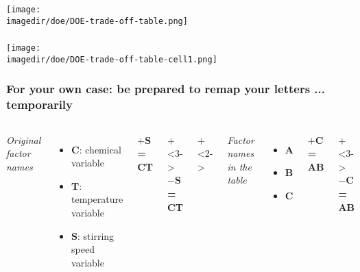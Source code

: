 \documentclass[handout,11pt,aspectratio=169,mathserif]{beamer}
\begin{document}
\begin{frame}\frametitle{}
	\begin{center}
	\texttt{[image: \\imagedir/doe/DOE-trade-off-table.png]}
	\end{center}
\end{frame}

\begin{frame}\frametitle{}
	\begin{center}
	\texttt{[image: \\imagedir/doe/DOE-trade-off-table-cell1.png]}
	\end{center}
\end{frame}

\begin{frame}\frametitle{For your own case: be prepared to remap your letters ... temporarily}
	\begin{columns}[b]
			\emph{Original factor names}
			
			\begin{itemize}
				\item	\textbf{C}: chemical variable
				\item	\textbf{T}: temperature variable
				\item	\textbf{S}: stirring speed variable
			\end{itemize}
			
			\vspace{1cm}
			\textbf{$+$S = CT}
			
		\onslide+<3->{
			\vspace{1cm}
			\textbf{$-$S = CT}
		}
			
		\onslide+<2->{
			\emph{Factor names in the table}
			
			\begin{itemize}
				\item	\textbf{A}
				\item	\textbf{B}
				\item	\textbf{C}
			\end{itemize}
			
			\vspace{1cm}
			\textbf{$+$C = AB}
		}
		
		\onslide+<3->{	
			\vspace{1cm}
			\textbf{$-$C = AB}
		}
	\end{columns}	
\end{frame}
\end{document}
